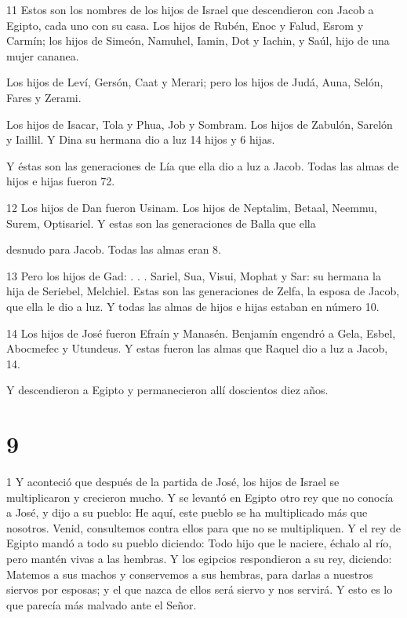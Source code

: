 \par 11 Estos son los nombres de los hijos de Israel que descendieron con Jacob a Egipto, cada uno con su casa. Los hijos de Rubén, Enoc y Falud, Esrom y Carmín; los hijos de Simeón, Namuhel, Iamin, Dot y Iachin, y Saúl, hijo de una mujer cananea.

\par Los hijos de Leví, Gersón, Caat y Merari; pero los hijos de Judá, Auna, Selón, Fares y Zerami.

\par Los hijos de Isacar, Tola y Phua, Job y Sombram. Los hijos de Zabulón, Sarelón y Iaillil. Y Dina su hermana dio a luz 14 hijos y 6 hijas.

\par Y éstas son las generaciones de Lía que ella dio a luz a Jacob. Todas las almas de hijos e hijas fueron 72.

\par 12 Los hijos de Dan fueron Usinam. Los hijos de Neptalim, Betaal, Neemmu, Surem, Optisariel. Y estas son las generaciones de Balla que ella
\par desnudo para Jacob. Todas las almas eran 8.

\par 13 Pero los hijos de Gad: . . . Sariel, Sua, Visui, Mophat y Sar: su hermana la hija de Seriebel, Melchiel. Estas son las generaciones de Zelfa, la esposa de Jacob, que ella le dio a luz. Y todas las almas de hijos e hijas estaban en número 10.

\par 14 Los hijos de José fueron Efraín y Manasén. Benjamín engendró a Gela, Esbel, Abocmefec y Utundeus. Y estas fueron las almas que Raquel dio a luz a Jacob, 14.

\par Y descendieron a Egipto y permanecieron allí doscientos diez años.

\chapter{9}

\par 1 Y aconteció que después de la partida de José, los hijos de Israel se multiplicaron y crecieron mucho. Y se levantó en Egipto otro rey que no conocía a José, y dijo a su pueblo: He aquí, este pueblo se ha multiplicado más que nosotros. Venid, consultemos contra ellos para que no se multipliquen. Y el rey de Egipto mandó a todo su pueblo diciendo: Todo hijo que le naciere, échalo al río, pero mantén vivas a las hembras. Y los egipcios respondieron a su rey, diciendo: Matemos a sus machos y conservemos a sus hembras, para darlas a nuestros siervos por esposas; y el que nazca de ellos será siervo y nos servirá. Y esto es lo que parecía más malvado ante el Señor.

